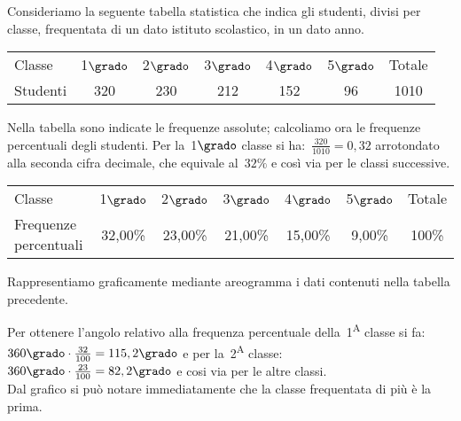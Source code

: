  \begin{esempio}
Consideriamo la seguente tabella statistica che indica gli studenti, divisi 
per classe, frequentata di un dato istituto scolastico, in un dato anno.

\begin{center}
\begin{tabular}{lcccccc}
\toprule
Classe & 1$\grado$ &2$\grado$ &3$\grado$ & 4$\grado$ &5$\grado$ &Totale\\
Studenti & 320 & 230 & 212 & 152 & 96 & 1010 \\
\bottomrule
\end{tabular}
\end{center}

Nella tabella sono indicate le frequenze assolute; calcoliamo ora le 
frequenze percentuali degli studenti.
Per la~1$\grado$ classe si ha:~$\frac{320}{1010}=0,32$ arrotondato alla 
seconda cifra decimale, che equivale al~$32\%$ e così via per le classi 
successive.

\begin{center}
\begin{tabular}{lcccccc}
\toprule
Classe & 1$\grado$ & 2$\grado$ & 3$\grado$ & 4$\grado$ & 5$\grado$ & Totale 
\\
 Frequenze percentuali& 32,00\% & 23,00\% & 21,00\% & 15,00\% & 9,00\% & 
100\% \\
\bottomrule
\end{tabular}
\end{center}

Rappresentiamo graficamente mediante areogramma i dati contenuti nella 
tabella precedente.

\begin{minipage}{.49 \textwidth}
Per ottenere l'angolo relativo alla frequenza percentuale 
della~1\textsuperscript{A} 
classe si fa:~$360\grado \cdot \frac{32}{100}=115,2\grado$ e per 
la~2\textsuperscript{A} classe:~$360\grado \cdot \frac{23}{100}=82,2\grado$ e 
cosi via per le altre classi. \\
Dal grafico si può notare immediatamente che la classe frequentata di più è 
la prima.
\end{minipage}
\hfill
\begin{minipage}{.49 \textwidth}
\begin{center}
%  
 \scalebox{.7}{}  
\end{center}
\end{minipage}
 \end{esempio}

